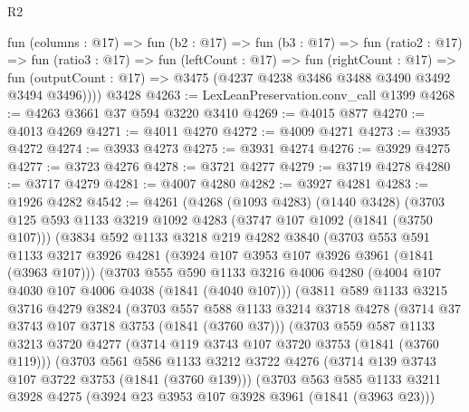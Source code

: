 \begin{lexlean}{R2}
\begin{coremodule}
        fun (columns : @17) =>
        fun (b2 : @17) =>
        fun (b3 : @17) =>
        fun (ratio2 : @17) =>
        fun (ratio3 : @17) =>
        fun (leftCount : @17) =>
        fun (rightCount : @17) =>
        fun (outputCount : @17) => @3475 (@4237 @4238 @3486 @3488 @3490 @3492 @3494 @3496))))
    @3428
@4263 := LexLeanPreservation.conv_call @1399
@4268 := @4263 @3661 @37 @594 @3220 @3410
@4269 := @4015 @877
@4270 := @4013 @4269
@4271 := @4011 @4270
@4272 := @4009 @4271
@4273 := @3935 @4272
@4274 := @3933 @4273
@4275 := @3931 @4274
@4276 := @3929 @4275
@4277 := @3723 @4276
@4278 := @3721 @4277
@4279 := @3719 @4278
@4280 := @3717 @4279
@4281 := @4007 @4280
@4282 := @3927 @4281
@4283 := @1926 @4282
@4542 := @4261
    (@4268
      (@1093 @4283)
      (@1440 @3428)
      (@3703
        @125
        @593
        @1133
        @3219
        @1092
        @4283
        (@3747 @107 @1092 (@1841 (@3750 @107)))
        (@3834
          @592
          @1133
          @3218
          @219
          @4282
          @3840
          (@3703
            @553
            @591
            @1133
            @3217
            @3926
            @4281
            (@3924 @107 @3953 @107 @3926 @3961 (@1841 (@3963 @107)))
            (@3703
              @555
              @590
              @1133
              @3216
              @4006
              @4280
              (@4004 @107 @4030 @107 @4006 @4038 (@1841 (@4040 @107)))
              (@3811
                @589
                @1133
                @3215
                @3716
                @4279
                @3824
                (@3703
                  @557
                  @588
                  @1133
                  @3214
                  @3718
                  @4278
                  (@3714 @37 @3743 @107 @3718 @3753 (@1841 (@3760 @37)))
                  (@3703
                    @559
                    @587
                    @1133
                    @3213
                    @3720
                    @4277
                    (@3714 @119 @3743 @107 @3720 @3753 (@1841 (@3760 @119)))
                    (@3703
                      @561
                      @586
                      @1133
                      @3212
                      @3722
                      @4276
                      (@3714 @139 @3743 @107 @3722 @3753 (@1841 (@3760 @139)))
                      (@3703
                        @563
                        @585
                        @1133
                        @3211
                        @3928
                        @4275
                        (@3924 @23 @3953 @107 @3928 @3961 (@1841 (@3963 @23)))

\end{coremodule}
\end{lexlean}

